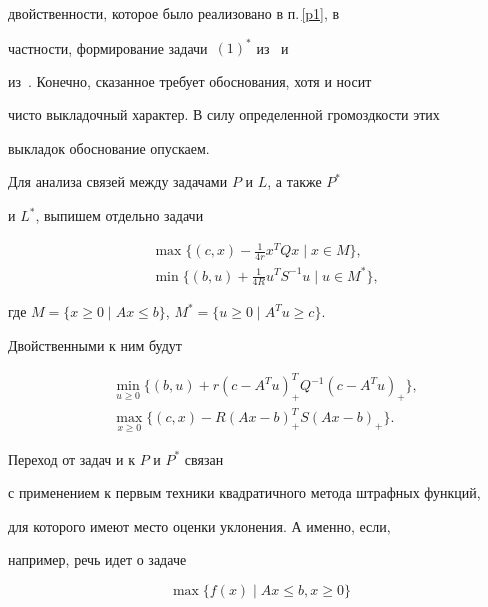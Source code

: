 двойственности, которое было реализовано в п.\,\ref{p1}, в


частности, формирование задачи~$(1)^*$ из~ и 


из~. Конечно, сказанное требует обоснования, хотя и носит


чисто выкладочный характер. В силу определенной громоздкости этих


выкладок обоснование опускаем.





Для анализа связей между задачами $P$ и $L$, а также $P^*$


и $L^*$, выпишем отдельно задачи


\begin{align}


&\max \{(c, x) -\tfrac{ 1}{ 4r} x^T Qx \mid x\in


M\},\label{f21}\\


& \min \{(b, u) +\tfrac{1}{4R} u^T S^{-1}u \mid u\in


M^*\},\label{f22}


\end{align}


где $M=\{x\ge 0 \mid Ax\le b\}$, $M^*=\{u\ge 0 \mid A^Tu\ge c\}$.


Двойственными к ним будут


\begin{align}


&\min_{u\ge 0} \{(b, u) +r (c-A^Tu)_+^T Q^{-1} (c-A^Tu)_+


\},\tag*{$(21)^*$} \\


&\max_{x\ge 0} \{(c, x) -R (Ax-b)_+^T S


(Ax-b)_+ \}.\tag*{$(22)^*$}


\end{align}


Переход от задач  и  к $P$ и $P^*$ связан


с применением к первым техники квадратичного метода штрафных функций,


для которого имеют место оценки уклонения. А именно, если,


например, речь идет о задаче


\begin{equation}


\label{f23}


\max \{ f(x) \mid Ax\leq b, x\geq 0\}


\end{equation}


